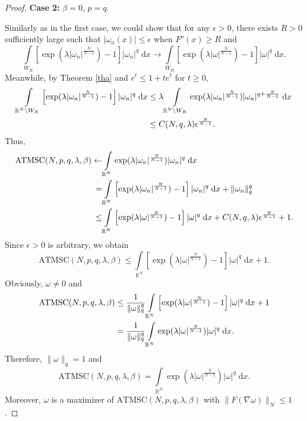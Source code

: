 \documentclass[10pt,a4paper]{amsart}
\newcommand{\R}{\mathbb{R}}
\begin{document}
\begin{proof}
{\bfseries Case 2:} $\beta=0$, $p=q$.

Similarly as in the first case, we could show that for any $\epsilon>0$, there exists $R>0$ sufficiently large such that $\lvert\omega_{n}(x)\rvert\leq\epsilon$ when $F^{o}(x)\geq R$ and
$$
\int\limits_{W_{R}}\left[\exp(\lambda\lvert \omega_{n}\rvert^{\frac{N}{N-1}})-1\right]\lvert \omega_{n}\rvert^{q}\;\mathrm{d}x\rightarrow\int\limits_{W_{R}}\left[\exp(\lambda\lvert \omega\rvert^{\frac{N}{N-1}})-1\right]\lvert \omega\rvert^{q}\;\mathrm{d}x.
$$
Meanwhile, by Theorem \ref{tha} and $e^{t}\leq1+te^{t}$ for $t\geq0$,
\begin{align}
    \int\limits_{\R^{N}\backslash W_{R}}\left[\exp(\lambda\lvert \omega_{n}\rvert^{\frac{N}{N-1}})-1\right]\lvert \omega_{n}\rvert^{q}\;\mathrm{d}x&\leq\lambda\int\limits_{\R^{N}\backslash W_{R}}\exp(\lambda\lvert \omega_{n}\rvert^{\frac{N}{N-1}})\lvert \omega_{n}\rvert^{q+\frac{N}{N-1}}\;\mathrm{d}x\notag\\
    &\leq C(N,q,\lambda)\epsilon^{\frac{N}{N-1}}.\notag
\end{align}
Thus,
\begin{align}
    \mathrm{ATMSC}(N,p,q,\lambda,\beta)\leftarrow&\int\limits_{\R^{N}}\exp(\lambda\lvert \omega_{n}\rvert^{\frac{N}{N-1}})\lvert \omega_{n}\rvert^{q}\;\mathrm{d}x\notag\\
    =&\int\limits_{\R^{N}}\left[\exp(\lambda\lvert \omega_{n}\rvert^{\frac{N}{N-1}})-1\right]\lvert \omega_{n}\rvert^{q}\;\mathrm{d}x+\|\omega_{n}\|_{q}^{q}\notag\\
    \leq&\int\limits_{\R^{N}}\left[\exp(\lambda\lvert \omega\rvert^{\frac{N}{N-1}})-1\right]\lvert \omega\rvert^{q}\;\mathrm{d}x+C(N,q,\lambda)\epsilon^{\frac{N}{N-1}}+1.\notag
\end{align}
Since $\epsilon>0$ is arbitrary, we obtain
$$
\mathrm{ATMSC}(N,p,q,\lambda,\beta)\leq\int\limits_{\R^{N}}\left[\exp(\lambda\lvert \omega\rvert^{\frac{N}{N-1}})-1\right]\lvert \omega\rvert^{q}\;\mathrm{d}x+1.
$$
Obviously, $\omega\not=0$ and
\begin{align}
    \mathrm{ATMSC}(N,p,q,\lambda,\beta)&\leq\frac{1}{\|\omega\|_{q}^{q}}\int\limits_{\R^{N}}\left[\exp(\lambda\lvert \omega\rvert^{\frac{N}{N-1}})-1\right]\lvert \omega\rvert^{q}\;\mathrm{d}x+1\notag\\
    &=\frac{1}{\|\omega\|_{q}^{q}}\int\limits_{\R^{N}}\exp(\lambda\lvert \omega\rvert^{\frac{N}{N-1}})\lvert \omega\rvert^{q}\;\mathrm{d}x.\notag
\end{align}
Therefore, $\|\omega\|_{q}=1$ and
$$
\mathrm{ATMSC}(N,p,q,\lambda,\beta)=\int\limits_{\R^{N}}\exp(\lambda\lvert \omega\rvert^{\frac{N}{N-1}})\lvert \omega\rvert^{q}\;\mathrm{d}x.
$$
Moreover, $\omega$ is a maximizer of $\mathrm{ATMSC}(N,p,q,\lambda,\beta)$ with $\|F(\nabla\omega)\|_{N}\leq1$.


\end{proof}
\end{document}
